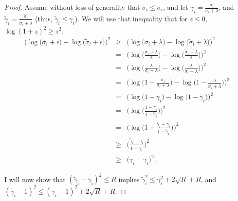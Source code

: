 \documentclass[12pt]{article}
\newcommand{\eps}{\epsilon}
\newcommand{\tsigma}{\tilde{\sigma}}
\newcommand{\tgamma}{\tilde{\gamma}}
\begin{document}
\begin{proof}
	Assume without loss of generality that $\tsigma_i \leq \sigma_i$, and let $\gamma_i=\frac{\sigma_i}{\sigma_i + \lambda}$, and $\tgamma_i=\frac{\tsigma_i}{\tsigma_i + \lambda}$ (thus, $\tgamma_i \leq \gamma_i$).  We will use that inequality that for $z \leq 0$, $\log(1+z)^2 \geq z^2$.
\begin{eqnarray*}
	\bigg(\log
	\Big(\sigma_i + \eps\Big) - \log\Big(\tsigma_i + \eps\Big)\bigg)^2 &\geq& 
	\bigg(\log
	\Big(\sigma_i + \lambda\Big) - \log\Big(\tsigma_i + \lambda\Big)\bigg)^2\\
	 &=& \bigg(\log\Big(\frac{\sigma_i + \lambda}{\lambda}\Big) - \log\Big(\frac{\tsigma_i + \lambda}{\lambda}\Big)\bigg)^2 \\
	&=& \bigg(\log\Big(\frac{\lambda}{\sigma_i + \lambda}\Big) - \log\Big(\frac{\lambda}{\tsigma_i + \lambda}\Big)\bigg)^2 \\
	&=& \bigg(\log\Big(1 - \frac{\sigma_i}{\sigma_i + \lambda}\Big) - \log\Big(1-\frac{\tsigma}{\tsigma_i + \lambda}\Big)\bigg)^2 \\
	&=& \bigg(\log\Big(1 - \gamma_i\Big) - \log\Big(1-\tgamma_i\Big)\bigg)^2 \\
	&=& \bigg(\log\Big(\frac{1-\gamma_i}{1-\tgamma_i}\Big)\bigg)^2 \\
	&=& \bigg(\log\Big(1 + \frac{\tgamma_i-\gamma_i}{1-\tgamma_i}\Big)\bigg)^2 \\
	&\geq&  \bigg(\frac{\tgamma_i-\gamma_i}{1-\tgamma_i}\bigg)^2 \\
	&\geq&  \big(\tgamma_i-\gamma_i\big)^2.
\end{eqnarray*}	

I will now show that $(\tgamma_i - \gamma_i)^2 \leq R$ implies $\tgamma_i^2 \leq \gamma_i^2 + 2\sqrt{R}+R$, and $(\tgamma_i-1)^2 \leq (\gamma_i-1)^2 + 2\sqrt{R}+R$:


\end{proof}
\end{document}
